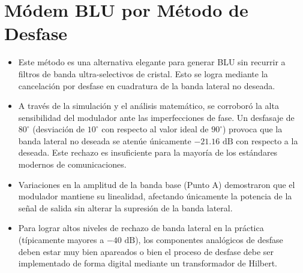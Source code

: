 \section{Módem BLU por Método de Desfase}
\begin{itemize}
    \item Este método es una alternativa elegante para generar BLU sin recurrir a filtros de banda ultra-selectivos
          de cristal. Esto se logra mediante la cancelación por desfase en cuadratura de la banda lateral no deseada.
    \item A través de la simulación y el análisis matemático, se corroboró la alta sensibilidad del modulador ante
          las imperfecciones de fase. Un desfasaje de $80^\circ$ (desviación de $10^\circ$ con respecto al valor ideal de
          $90^\circ$) provoca que la banda lateral no deseada se atenúe únicamente $-21.16\text{ dB}$ con respecto a la deseada.
          Este rechazo es insuficiente para la mayoría de los estándares modernos de comunicaciones.
    \item Variaciones en la amplitud de la banda base (Punto A) demostraron que el modulador mantiene su linealidad,
          afectando únicamente la potencia de la señal de salida sin alterar la supresión de la banda lateral.
    \item Para lograr altos niveles de rechazo de banda lateral en la práctica (típicamente mayores a $-40\text{ dB}$),
          los componentes analógicos de desfase deben estar muy bien apareados o bien el proceso de desfase debe
          ser implementado de forma digital mediante un transformador de Hilbert.
\end{itemize}
